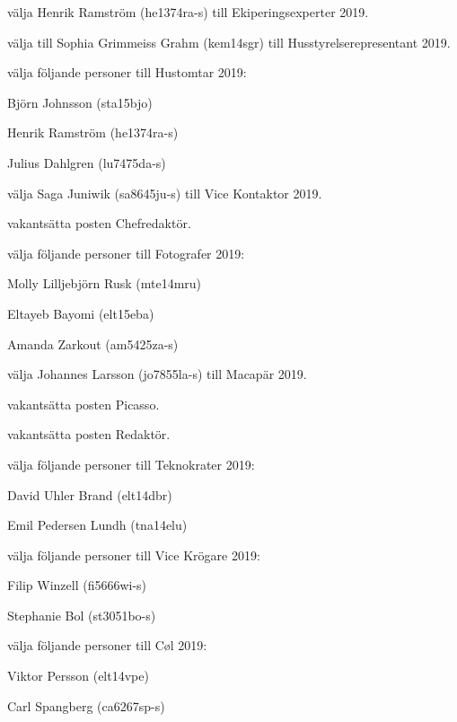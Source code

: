 \documentclass[10pt]{article}
\begin{document}
\begin{paragrafer}
\begin{paralist}
    \Mba välja Henrik Ramström (he1374ra-s) till Ekiperingsexperter 2019.

    \Mba välja till Sophia Grimmeiss Grahm (kem14sgr) till Husstyrelserepresentant 2019.

    \Mba välja följande personer till Hustomtar 2019:
    \begin{tightdashlist}
        \item Björn Johnsson (sta15bjo)
        \item Henrik Ramström (he1374ra-s)
        \item Julius Dahlgren (lu7475da-s)
    \end{tightdashlist}

    \Mba välja Saga Juniwik (sa8645ju-s) till Vice Kontaktor 2019.

    \Mba vakantsätta posten Chefredaktör.

    \Mba välja följande personer till Fotografer 2019:
    \begin{tightdashlist}
        \item Molly Lilljebjörn Rusk (mte14mru)
        \item Eltayeb Bayomi (elt15eba)
        \item Amanda Zarkout (am5425za-s)
    \end{tightdashlist}

    \Mba välja Johannes Larsson (jo7855la-s) till Macapär 2019.

    \Mba vakantsätta posten Picasso.

    \Mba vakantsätta posten Redaktör.

    \Mba välja följande personer till Teknokrater 2019:
    \begin{tightdashlist}
        \item David Uhler Brand (elt14dbr)
        \item Emil Pedersen Lundh (tna14elu)
    \end{tightdashlist}

    \Mba välja följande personer till Vice Krögare 2019:
    \begin{tightdashlist}
        \item Filip Winzell (fi5666wi-s)
        \item Stephanie Bol (st3051bo-s)
    \end{tightdashlist}

    \Mba välja följande personer till Cøl 2019:
    \begin{tightdashlist}
        \item Viktor Persson (elt14vpe)
        \item Carl Spangberg (ca6267sp-s)
    \end{tightdashlist}


\end{paralist}
\end{paragrafer}
\end{document}
